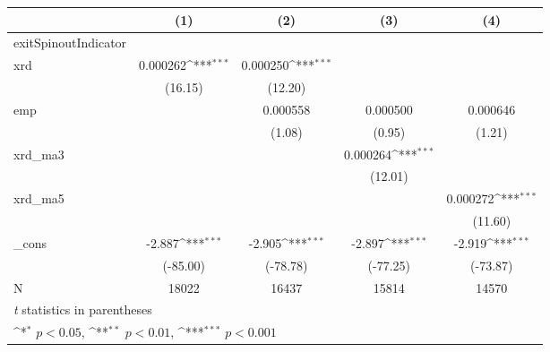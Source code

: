 {
\def\sym#1{\ifmmode^{#1}\else\(^{#1}\)\fi}
\begin{tabular}{l*{4}{c}}
\hline\hline
            &\multicolumn{1}{c}{(1)}         &\multicolumn{1}{c}{(2)}         &\multicolumn{1}{c}{(3)}         &\multicolumn{1}{c}{(4)}         \\
\hline
exitSpinoutIndicator&                     &                     &                     &                     \\
xrd         &    0.000262\sym{***}&    0.000250\sym{***}&                     &                     \\
            &     (16.15)         &     (12.20)         &                     &                     \\
[1em]
emp         &                     &    0.000558         &    0.000500         &    0.000646         \\
            &                     &      (1.08)         &      (0.95)         &      (1.21)         \\
[1em]
xrd\_ma3     &                     &                     &    0.000264\sym{***}&                     \\
            &                     &                     &     (12.01)         &                     \\
[1em]
xrd\_ma5     &                     &                     &                     &    0.000272\sym{***}\\
            &                     &                     &                     &     (11.60)         \\
[1em]
\_cons      &      -2.887\sym{***}&      -2.905\sym{***}&      -2.897\sym{***}&      -2.919\sym{***}\\
            &    (-85.00)         &    (-78.78)         &    (-77.25)         &    (-73.87)         \\
\hline
N           &       18022         &       16437         &       15814         &       14570         \\
\hline\hline
\multicolumn{5}{l}{\footnotesize \textit{t} statistics in parentheses}\\
\multicolumn{5}{l}{\footnotesize \sym{*} \(p<0.05\), \sym{**} \(p<0.01\), \sym{***} \(p<0.001\)}\\
\end{tabular}
}
